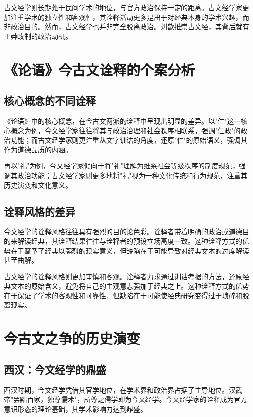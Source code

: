 \documentclass[12pt,a4paper]{article}
\begin{document}
古文经学则长期处于民间学术的地位，与官方政治保持一定的距离。古文经学家更加注重学术的独立性和客观性，其诠释活动更多是出于对经典本身的学术兴趣，而非政治目的。然而，古文经学也并非完全脱离政治。刘歆推崇古文经，其背后就有王莽改制的政治动机。

\section{《论语》今古文诠释的个案分析}

\subsection{核心概念的不同诠释}

《论语》中的核心概念，在今古文两派的诠释中呈现出明显的差异。以"仁"这一核心概念为例，今文经学家往往将其与政治治理和社会秩序相联系，强调"仁政"的政治功能；而古文经学家则更注重从文字训诂的角度，还原"仁"的原始语义，强调其作为道德品质的内涵。

再以"礼"为例，今文经学家倾向于将"礼"理解为维系社会等级秩序的制度规范，强调其政治功能；古文经学家则更多地将"礼"视为一种文化传统和行为规范，注重其历史演变和文化意义。

\subsection{诠释风格的差异}

今文经学的诠释风格往往具有强烈的目的论色彩。诠释者带着明确的政治或道德目的来解读经典，其诠释结果往往与诠释者的预设立场高度一致。这种诠释方式的优势在于赋予了经典以强烈的现实意义，但缺陷在于可能导致对经典文本的过度解读甚至曲解。

古文经学的诠释风格则更加审慎和客观。诠释者力求通过训诂考据的方法，还原经典文本的原始含义，避免将自己的主观意志强加于经典之上。这种诠释方式的优势在于保证了学术的客观性和可靠性，但缺陷在于可能使经典研究变得过于琐碎和脱离现实。

\section{今古文之争的历史演变}

\subsection{西汉：今文经学的鼎盛}

西汉时期，今文经学凭借其官学地位，在学术界和政治界占据了主导地位。汉武帝"罢黜百家，独尊儒术"，所尊之儒学即为今文经学。今文经学家的诠释成为官方意识形态的理论基础，其学术影响力达到鼎盛。
\end{document}
